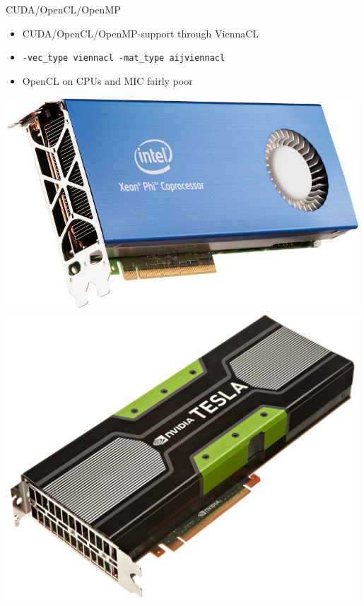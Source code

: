 \begin{frame}[fragile]
\begin{minipage}{0.75\textwidth}
  \begin{block}{CUDA/OpenCL/OpenMP}
  \begin{itemize}
   \item CUDA/OpenCL/OpenMP-support through ViennaCL
   \item \lstinline|-vec_type viennacl -mat_type aijviennacl|
   \item OpenCL on CPUs and MIC fairly poor
  \end{itemize}
  \end{block}
 \end{minipage}
 \begin{minipage}{0.23\textwidth}
 \vspace*{1cm}
 \includegraphics[width=0.99\textwidth]{figures/xeon-phi.jpg} \\[1.5em]
 \includegraphics[width=0.99\textwidth]{figures/TeslaK20.jpg} \\[1.5em]

\end{minipage}
\end{frame}
